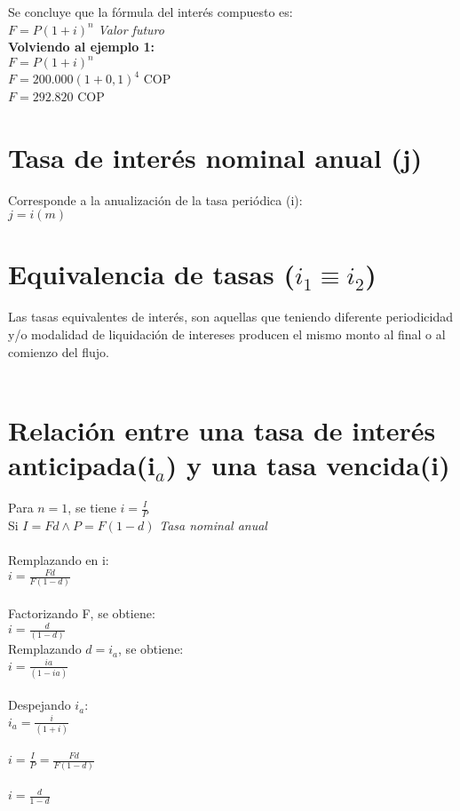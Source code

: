 Se concluye que la fórmula del interés compuesto es:\\
$F = P(1+i)^n$ \hspace{20 pt} \textit{Valor futuro}\\

\textbf{Volviendo al ejemplo 1:}\\
$F = P(1+i)^n$\\
$F =  200.000 (1+0,1)^4$ COP\\
$F =  292.820$ COP\\



\section{Tasa de interés nominal anual (j)}
Corresponde a la anualización de la tasa periódica (i):\\
$j = i(m)$\\



\section{Equivalencia de tasas ($i_{1} \equiv i_{2}$)}
Las tasas equivalentes de interés,  son aquellas que teniendo diferente periodicidad y/o 
modalidad de liquidación de intereses producen el mismo monto al final o al comienzo del flujo.\\
\\


\section{Relación entre una tasa de interés anticipada(i$_{a}$) y una tasa vencida(i)}
Para $n = 1$, se tiene
$i = \frac{I}{P}$ \\
Si $I = F  d \land P = F (1 -d)$ \hspace{35 pt}\textit{Tasa nominal anual}\\\\
Remplazando en i: \\
$i = \frac {F d} {F (1-d)}$\\\\
Factorizando F,  se obtiene: \\
$i = \frac{d}{(1 - d)}$\\
Remplazando $d = i_{a} $, se obtiene: \\
$i = \frac{ia}{(1 - ia)}$\\\\
Despejando $i_{a}$: \\
$i_{a} = \frac{i}{(1+i)}$ \\\\
$i = \frac{I}{P} = \frac{F d}{F(1-d)}$\\\\
$i = \frac{d}{1-d}$\\

